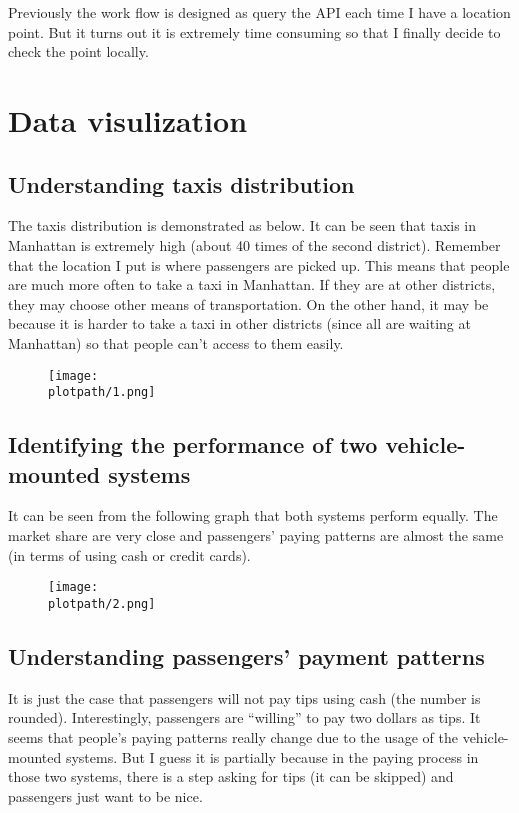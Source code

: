 \documentclass[a4paper]{article}
\begin{document}
Previously the work flow is designed as query the API each time I have a location point. But it turns out it is extremely time consuming so that I finally decide to check the point locally.

\section{Data visulization}
\subsection{Understanding taxis distribution}
The taxis distribution is demonstrated as below. It can be seen that taxis in Manhattan is extremely high (about 40 times of the second district). Remember that the location I put is where passengers are picked up. This means that people are much more often to take a taxi in Manhattan. If they are at other districts, they may choose other means of transportation. On the other hand, it may be because it is harder to take a taxi in other districts (since all are waiting at Manhattan) so that people can't access to them easily.

\begin{figure}[H]
\begin{center}
\texttt{[image: \\plotpath/1.png]}
\end{center}
\label{}
\end{figure}

\subsection{Identifying the performance of two vehicle-mounted systems}
It can be seen from the following graph that both systems perform equally. The market share are very close and passengers' paying patterns are almost the same (in terms of using cash or credit cards).

\begin{figure}[H]
\begin{center}
\texttt{[image: \\plotpath/2.png]}
\end{center}
\label{}
\end{figure}

\subsection{Understanding passengers' payment patterns}
It is just the case that passengers will not pay tips using cash (the number is rounded). Interestingly, passengers are ``willing'' to pay two dollars as tips. It seems that people's paying patterns really change due to the usage of the vehicle-mounted systems. But I guess it is partially because in the paying process in those two systems, there is a step asking for tips (it can be skipped) and passengers just want to be nice.
\end{document}
